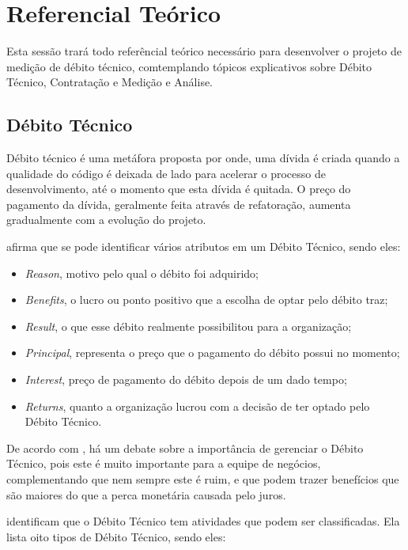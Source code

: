 \chapter[Referencial Teórico]{Referencial Teórico}

Esta sessão trará todo referêncial teórico necessário para desenvolver o projeto
de medição de débito técnico, comtemplando tópicos explicativos sobre Débito Técnico,
Contratação e Medição e Análise.

\section{Débito Técnico}
Débito técnico é uma metáfora proposta por \cite{cunningham} onde, uma dívida é
criada quando a qualidade do código é deixada de lado para acelerar o processo
de desenvolvimento, até o momento que esta dívida é quitada. O preço do pagamento
da dívida, geralmente feita através de refatoração,  aumenta gradualmente com
a evolução do projeto.

\cite{oliveira} afirma que se pode identificar vários atributos em um Débito
Técnico, sendo eles:

\begin{itemize}
  \item \textit{Reason}, motivo pelo qual o débito foi adquirido;
  \item \textit{Benefits}, o lucro ou ponto positivo que a escolha de optar pelo débito traz;
  \item \textit{Result}, o que esse débito realmente possibilitou para a organização;
  \item \textit{Principal}, representa o preço que o pagamento do débito possui no momento;
  \item \textit{Interest}, preço de pagamento do débito depois de um dado tempo;
  \item \textit{Returns}, quanto a organização lucrou com a decisão de ter optado pelo Débito Técnico.
\end{itemize}


De acordo com \cite{mapping}, há um debate sobre a importância de gerenciar o
Débito Técnico, pois este é muito importante para a equipe de negócios,
complementando que nem sempre este é ruim, e que podem trazer benefícios
que são maiores do que a perca monetária causada pelo juros.

\cite{mapping} identificam que o Débito Técnico tem atividades que podem ser classificadas.
Ela lista oito tipos de Débito Técnico, sendo eles:

